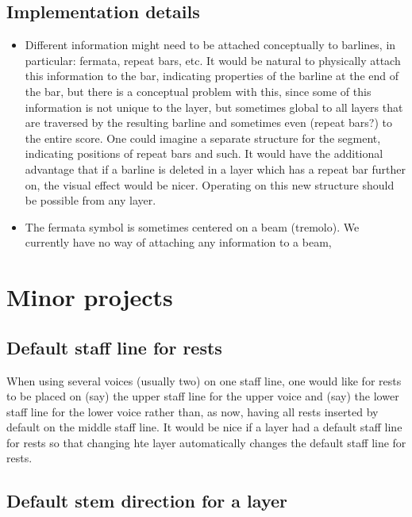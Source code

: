 \subsection{Implementation details}

\begin{itemize}
\item Different information might need to be attached conceptually to
  barlines, in particular: fermata, repeat bars, etc.  It would be
  natural to physically attach this information to the bar, indicating
  properties of the barline at the end of the bar, but there is a
  conceptual problem with this, since some of this information is not
  unique to the layer, but sometimes global to all layers that are
  traversed by the resulting barline and sometimes even (repeat bars?)
  to the entire score.  One could imagine a separate structure for the
  segment, indicating positions of repeat bars and such.  It would
  have the additional advantage that if a barline is deleted in a
  layer which has a repeat bar further on, the visual effect would be
  nicer.  Operating on this new structure should be possible from any
  layer. 
\item The fermata symbol is sometimes centered on a beam (tremolo).
  We currently have no way of attaching any information to a beam,  
\end{itemize}

\section{Minor projects}

\subsection{Default staff line for rests}

When using several voices (usually two) on one staff line, one would
like for rests to be placed on (say) the upper staff line for the
upper voice and (say) the lower staff line for the lower voice rather
than, as now, having all rests inserted by default on the middle staff
line.  It would be nice if a layer had a default staff line for rests
so that changing hte layer automatically changes the default staff
line for rests.  

\subsection{Default stem direction for a layer}

